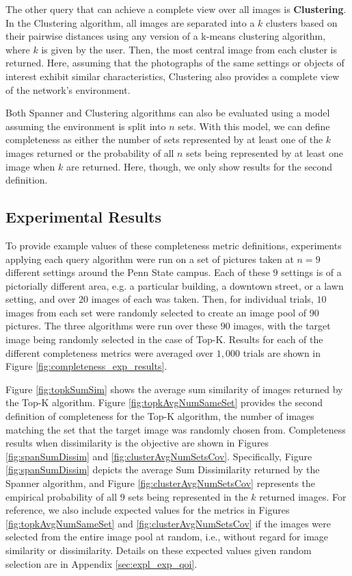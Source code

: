 The other query that can achieve a complete view over all images is {\bf Clustering}.  In the Clustering algorithm, all images are separated into a $k$ clusters based on their pairwise distances using any version of a k-means clustering algorithm, where $k$ is given by the user.  Then, the most central image from each cluster is returned.  
Here, assuming that the photographs of the same settings or objects of interest exhibit similar characteristics, 
Clustering also provides a complete view of the network's environment.

Both Spanner and Clustering algorithms can also be evaluated using a model assuming the environment is split into $n$ sets.  With this model, we can define completeness as either the number of sets represented by at least one of the $k$ images returned or the probability of all $n$ sets being represented by at least one image when $k$ are returned.  Here, though, we only show results for the second definition.

\subsection{Experimental Results}

To provide example values of these completeness metric definitions, experiments applying each query algorithm were run on a set of pictures taken at $n = 9$ different settings around the Penn State campus.  Each of these $9$ settings is of a pictorially different area, e.g. a particular building, a downtown street, or a lawn setting, and over $20$ images of each was taken.  Then, for individual trials, $10$ images from each set were randomly selected to create an image pool of $90$ pictures.  The three algorithms were run over these $90$ images, with the target image being randomly selected in the case of Top-K.  Results for each of the different completeness metrics were averaged over $1,000$ trials are shown in Figure \ref{fig:completeness_exp_results}. %

Figure \ref{fig:topkSumSim} shows the average sum similarity of images returned by the Top-K algorithm.  Figure \ref{fig:topkAvgNumSameSet} provides the second definition of completeness for the Top-K algorithm, the number of images matching the set that the target image was randomly chosen from.  Completeness results when dissimilarity is the objective are shown in Figures \ref{fig:spanSumDissim} and \ref{fig:clusterAvgNumSetsCov}.  Specifically, Figure \ref{fig:spanSumDissim} depicts the average Sum Dissimilarity returned by the Spanner algorithm, and Figure \ref{fig:clusterAvgNumSetsCov} represents the empirical probability of all $9$ sets being represented in the $k$ returned images.   For reference, we also include expected values for the metrics in Figures \ref{fig:topkAvgNumSameSet} and \ref{fig:clusterAvgNumSetsCov} if the images were selected from the entire image pool at random, i.e., without regard for image similarity or dissimilarity.  Details on these expected values given random selection are in Appendix \ref{sec:expl_exp_qoi}.


